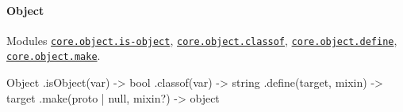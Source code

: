  \paragraph*{Object}

Modules \href{https://github.com/zloirock/core-js/blob/v2.6.0/modules/core.object.is-object.js}{\tt {\ttfamily core.\+object.\+is-\/object}}, \href{https://github.com/zloirock/core-js/blob/v2.6.0/modules/core.object.classof.js}{\tt {\ttfamily core.\+object.\+classof}}, \href{https://github.com/zloirock/core-js/blob/v2.6.0/modules/core.object.define.js}{\tt {\ttfamily core.\+object.\+define}}, \href{https://github.com/zloirock/core-js/blob/v2.6.0/modules/core.object.make.js}{\tt {\ttfamily core.\+object.\+make}}. 
\begin{DoxyCode}
Object
  .isObject(var) -> bool
  .classof(var) -> string
  .define(target, mixin) -> target
  .make(proto | null, mixin?) -> object
\end{DoxyCode}


